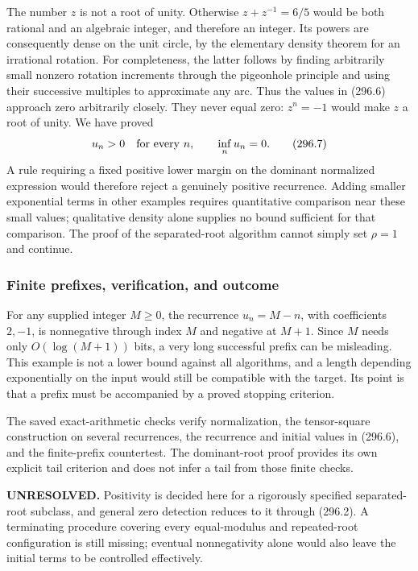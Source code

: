 \documentclass[11pt]{article}
\begin{document}
The number $z$ is not a root of unity. Otherwise $z+z^{-1}=6/5$ would be both rational and an algebraic integer, and therefore an integer. Its powers are consequently dense on the unit circle, by the elementary density theorem for an irrational rotation. For completeness, the latter follows by finding arbitrarily small nonzero rotation increments through the pigeonhole principle and using their successive multiples to approximate any arc. Thus the values in (296.6) approach zero arbitrarily closely. They never equal zero: $z^n=-1$ would make $z$ a root of unity. We have proved
\[
 u_n>0\quad\hbox{for every }n,\qquad \inf_n u_n=0.
 \tag{296.7}
\]
A rule requiring a fixed positive lower margin on the dominant normalized expression would therefore reject a genuinely positive recurrence. Adding smaller exponential terms in other examples requires quantitative comparison near these small values; qualitative density alone supplies no bound sufficient for that comparison. The proof of the separated-root algorithm cannot simply set $\rho=1$ and continue.

\subsubsection{Finite prefixes, verification, and outcome}
For any supplied integer $M\ge0$, the recurrence $u_n=M-n$, with coefficients $2,-1$, is nonnegative through index $M$ and negative at $M+1$. Since $M$ needs only $O(\log(M+1))$ bits, a very long successful prefix can be misleading. This example is not a lower bound against all algorithms, and a length depending exponentially on the input would still be compatible with the target. Its point is that a prefix must be accompanied by a proved stopping criterion.

The saved exact-arithmetic checks verify normalization, the tensor-square construction on several recurrences, the recurrence and initial values in (296.6), and the finite-prefix countertest. The dominant-root proof provides its own explicit tail criterion and does not infer a tail from those finite checks.

\textbf{UNRESOLVED.} Positivity is decided here for a rigorously specified separated-root subclass, and general zero detection reduces to it through (296.2). A terminating procedure covering every equal-modulus and repeated-root configuration is still missing; eventual nonnegativity alone would also leave the initial terms to be controlled effectively.
\end{document}
